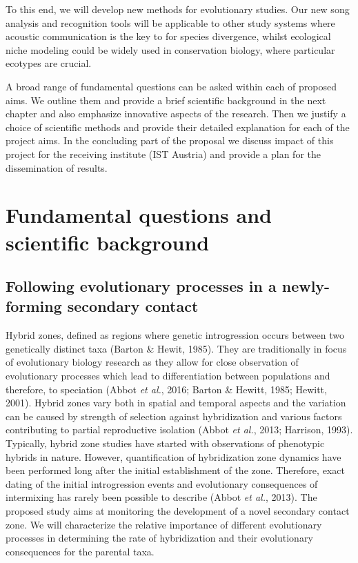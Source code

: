 \documentclass[11pt,a4paper]{article}
\begin{document}
To this end, we will develop new methods for evolutionary studies. Our new song analysis and recognition tools will be applicable to other study systems where acoustic communication is the key to for species divergence, whilst ecological niche modeling could be widely used in conservation biology, where particular ecotypes are crucial.

A broad range of fundamental questions can be asked within each of proposed aims. We outline them and provide a brief scientific background in the next chapter and also emphasize innovative aspects of the research. Then we justify a choice of scientific methods and provide their detailed explanation for each of the project aims. In the concluding part of the proposal we discuss impact of this project for the receiving institute (IST Austria) and provide a plan for the dissemination of results. 


\section{Fundamental questions and scientific background}
\subsection{Following evolutionary processes in a newly-forming secondary contact}

Hybrid zones, defined as regions where genetic introgression occurs between two genetically distinct taxa (Barton \& Hewit, 1985). They are traditionally in focus of evolutionary biology research as they allow for close observation of evolutionary processes which lead to differentiation between populations and therefore, to speciation (Abbot \textit{et al.}, 2016; Barton \& Hewitt, 1985; Hewitt, 2001). Hybrid zones vary both in spatial and temporal aspects and the variation can be caused by strength of selection against hybridization and various factors contributing to partial reproductive isolation (Abbot \textit{et al.}, 2013; Harrison, 1993). Typically, hybrid zone studies have started with observations of phenotypic hybrids in nature. However, quantification of hybridization zone dynamics have been performed long after the initial establishment of the zone. Therefore, exact dating of the initial introgression events and evolutionary consequences of intermixing has rarely been possible to describe (Abbot \textit{et al.}, 2013). The proposed study aims at monitoring the development of a novel secondary contact zone. We will characterize the relative importance of different evolutionary processes in determining the rate of hybridization and their evolutionary consequences for the parental taxa. 
\end{document}
